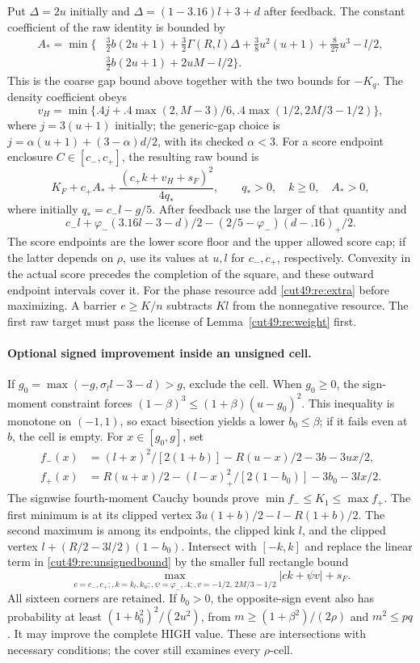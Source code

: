 \documentclass[11pt,a4paper]{article}
\numberwithin{equation}{section}
\theoremstyle{definition}
\theoremstyle{remark}
\begin{document}
Put $\Delta=2u$ initially and $\Delta=(1-3.16)l+3+d$ after feedback.
The constant coefficient of the raw identity is bounded by
\begin{align*}
 A_* =\min\bigl\{&\tfrac32b(2u+1)+\tfrac32\Gamma(R,l)\Delta
       +\tfrac38u^2(u+1)+\tfrac8{27}u^3-l/2,\\
      &\tfrac32b(2u+1)+2uM-l/2\bigr\}.
\end{align*}
This is the coarse gap bound above together with the two bounds for
$-K_q$. The density coefficient obeys
\[
 v_H=\min\{.4j+.4\max(2,M-3)/6,
                     .4\max(1/2,2M/3-1/2)\},
\]
where $j=3(u+1)$ initially; the generic-gap choice is
$j=\alpha(u+1)+(3-\alpha)d/2$, with its checked $\alpha<3$.
For a score endpoint enclosure $C\in[c_-,c_+]$, the resulting raw
bound is
\begin{equation}\label{cut49:re:unsignedbound}
 K_F+c_+A_*+\frac{(c_+k+v_H+s_F)^2}{4q_*},
 \qquad q_*>0,\quad k\ge0,\quad A_*>0,
\end{equation}
where initially $q_*=c_-l-g/5$. After feedback use the larger of that
quantity and
\[
 c_-l+\varphi_-(3.16l-3-d)/2
                  -(2/5-\varphi_-)(d-.16)_+/2.
\]
The score endpoints are the lower score floor and the upper allowed
score cap; if the latter depends on $\rho$, use its values at $u,l$
for $c_-,c_+$, respectively. Convexity in the actual score precedes the
completion of the square, and these outward endpoint intervals cover it.
For the phase resource add \eqref{cut49:re:extra} before maximizing. A barrier
$e\ge K/n$ subtracts $K l$ from the nonnegative resource. The first raw
target must pass the license of Lemma~\ref{cut49:re:weight} first.

\paragraph{Optional signed improvement inside an unsigned cell.}
If $g_0=\max(-g,\sigma_l l-3-d)>g$, exclude the cell. When $g_0\ge0$,
the sign-moment constraint forces
$(1-\beta)^3\le(1+\beta)(u-g_0)^2$.
This inequality is monotone on $(-1,1)$, so exact bisection yields a
lower $b_0\le\beta$; if it fails even at $b$, the cell is empty.
For $x\in[g_0,g]$, set
\begin{align*}
 f_-(x)&=(l+x)^2/[2(1+b)]-R(u-x)/2-3b-3ux/2,\\
 f_+(x)&=R(u+x)/2-(l-x)_+^2/[2(1-b_0)]-3b_0-3lx/2.
\end{align*}
The signwise fourth-moment Cauchy bounds prove
$\min f_-\le K_1\le\max f_+$. The first minimum is at its clipped
vertex $3u(1+b)/2-l-R(1+b)/2$. The second maximum is among its endpoints,
the clipped kink $l$, and the clipped vertex
$l+(R/2-3l/2)(1-b_0)$. Intersect with $[-k,k]$ and replace the linear
term in \eqref{cut49:re:unsignedbound} by the smaller full rectangle bound
\[
 \max_{c=c_-,c_+;,k=k_l,k_u;,\psi=\varphi_-,.4;,
             v=-1/2,\,2M/3-1/2}|ck+\psi v|+s_F.
\]
All sixteen corners are retained. If $b_0>0$, the opposite-sign event
also has probability at least $(1+b_0^2)^2/(2u^2)$, from
$m\ge(1+\beta^2)/(2\rho)$ and $m^2\le pq$. It may improve the complete
HIGH value. These are intersections with necessary conditions; the cover
still examines every $\rho$-cell.
\end{document}
